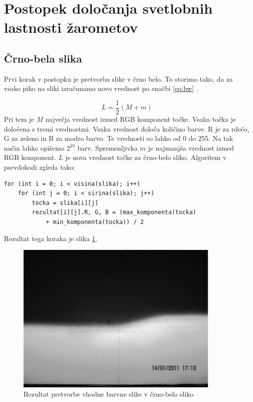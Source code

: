 \documentclass[oneside, a4paper, 12pt]{book}
\begin{document}
\section{Postopek določanja svetlobnih lastnosti žarometov}
\subsection{Črno-bela slika}
Prvi korak v postopku je pretvorba slike v črno belo. To storimo tako, da za vsako piko na sliki izračunamo novo vrednost po enačbi \ref{eq:bw} \cite{LHS}.

\begin{equation}
L=\dfrac{1}{2}(M+m)
\label{eq:bw}
\end{equation}
Pri tem je $M$ največja vrednost izmed RGB \cite{RGB} komponent točke. Vsaka točka je določena s tremi vrednostmi. Vsaka vrednost določa količino barve. R je za rdečo, G za zeleno in B za modro barvo. Te vrednosti so lahko od 0 do 255. Na tak način lahko opišemo $2^{24}$ barv. Spremenljivka $m$ je najmanjša vrednost izmed RGB komponent. $L$ je nova vrednost točke za črno-belo sliko. Algoritem v psevdokodi zgleda tako:
\begin{samepage}
\begin{verbatim}
for (int i = 0; i < visina(slika); i++)
    for (int j = 0; i < sirina(slika); j++)
	    tocka = slika[i][j]
	    rezultat[i][j].R, G, B = (max_komponenta(tocka) 
	        + min_komponenta(tocka)) / 2
\end{verbatim}
\end{samepage}
Rezultat tega koraka je slika \ref{pic:bw}.



\begin{figure}
\begin{center}
\includegraphics[width=10cm]{slike/crno-bela-slika.jpg}
\end{center}
\caption{Rezultat pretvorbe vhodne barvne slike v črno-belo sliko.}
\label{pic:bw}
\end{figure}
\end{document}
